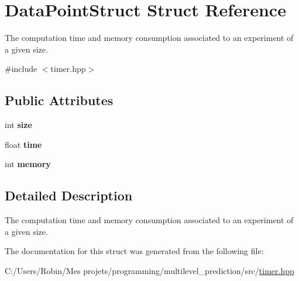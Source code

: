 \hypertarget{struct_data_point_struct}{}\section{Data\+Point\+Struct Struct Reference}
\label{struct_data_point_struct}


The computation time and memory consumption associated to an experiment of a given size.  




{\ttfamily \#include $<$timer.\+hpp$>$}

\subsection*{Public Attributes}
\begin{DoxyCompactItemize}
\item 
\hypertarget{struct_data_point_struct_ac42ecde939c4bb686fbe3ce67d5c34e3}{}int {\bfseries size}\label{struct_data_point_struct_ac42ecde939c4bb686fbe3ce67d5c34e3}

\item 
\hypertarget{struct_data_point_struct_ae1dae54ff363ef8a6d946907b1621506}{}float {\bfseries time}\label{struct_data_point_struct_ae1dae54ff363ef8a6d946907b1621506}

\item 
\hypertarget{struct_data_point_struct_a6d345b8aa7e79cd06402446d73d19520}{}int {\bfseries memory}\label{struct_data_point_struct_a6d345b8aa7e79cd06402446d73d19520}

\end{DoxyCompactItemize}


\subsection{Detailed Description}
The computation time and memory consumption associated to an experiment of a given size. 

The documentation for this struct was generated from the following file\+:\begin{DoxyCompactItemize}
\item 
C\+:/\+Users/\+Robin/\+Mes projets/programming/multilevel\+\_\+prediction/src/\hyperlink{timer_8hpp}{timer.\+hpp}\end{DoxyCompactItemize}
